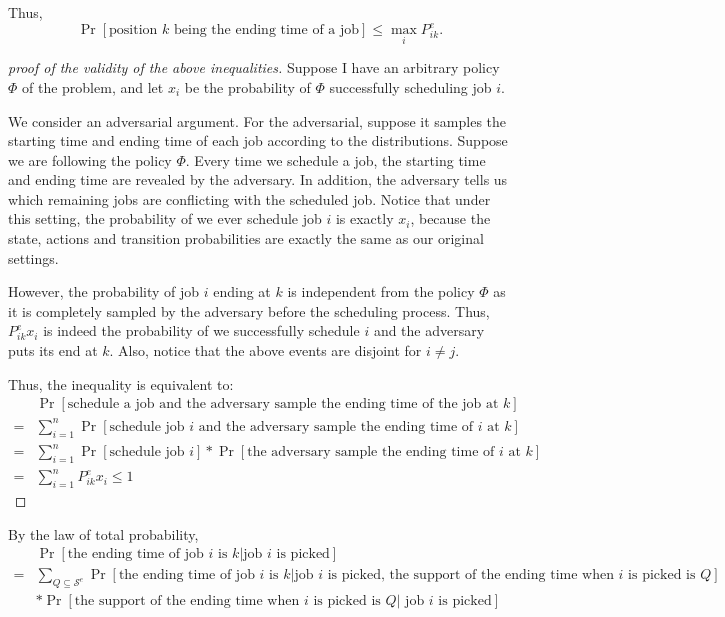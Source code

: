 \documentclass{article}
\begin{document}
Thus, 
\[\Pr[\text{position $k$ being the ending time of a job}]\leq \max_{i}P_{ik}^e.\]
\begin{proof}[proof of the validity of the above inequalities]
Suppose I have an arbitrary policy $\Phi$ of the problem, 
and let $x_i$ be the probability of $\Phi$ successfully scheduling job $i$.

We consider an adversarial argument. 
For the adversarial, suppose it samples the starting time and ending time of each job according to the distributions.
Suppose we are following the policy $\Phi$.
Every time we schedule a job, the starting time and ending time are revealed by the adversary. 
In addition, the adversary tells us which remaining jobs are conflicting with the scheduled job.
Notice that under this setting, the probability of we ever schedule job $i$ is exactly $x_i$, because the state, actions and transition probabilities are exactly the same as our original settings.

However, the probability of job $i$ ending at $k$ is independent from the policy $\Phi$ as it is completely sampled by the adversary before the scheduling process.
Thus, $P_{ik}^e x_i$ is indeed the probability of we successfully schedule $i$ and the adversary puts its end at $k$.
Also, notice that the above events are disjoint for $i\neq j$.

Thus, the inequality is equivalent to:
\begin{align*}
    &\Pr[\text{schedule a job and the adversary sample the ending time of the job at $k$}]\\
    =&\sum_{i=1}^{n}\Pr[\text{schedule job $i$ and the adversary sample the ending time of $i$ at $k$}]\\
    =&\sum_{i=1}^{n}\Pr[\text{schedule job $i$}]*\Pr[\text{the adversary sample the ending time of $i$ at $k$}]\\
    =&\sum_{i=1}^{n}P_{ik}^e x_i \leq 1
\end{align*}
\end{proof}



By the law of total probability,
\begin{align*}
    &\Pr[\text{the ending time of job $i$ is $k$}|\text{job $i$ is picked}]\\
   =&\sum_{Q\subseteq \mathcal{S}^e}\Pr[\text{the ending time of job $i$ is $k$}|\text{job $i$ is picked, the support of the ending time when $i$ is picked is $Q$}]\\
   &*\Pr[\text{the support of the ending time when $i$ is picked is $Q|$ job $i$ is picked}]
\end{align*}
\end{document}
